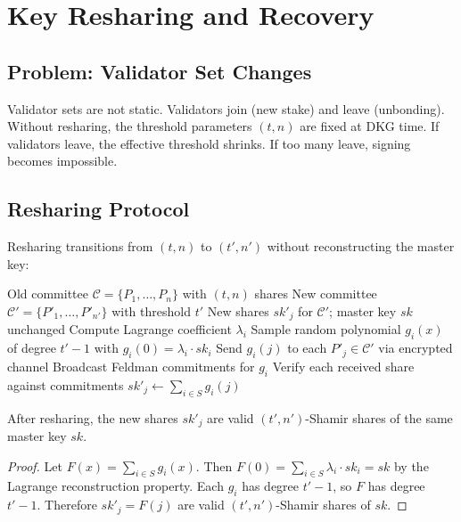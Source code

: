 \section{Key Resharing and Recovery}

\label{sec:resharing}

\subsection{Problem: Validator Set Changes}

Validator sets are not static. Validators join (new stake) and leave (unbonding).
Without resharing, the threshold parameters $(t, n)$ are fixed at DKG time. If
validators leave, the effective threshold shrinks. If too many leave, signing
becomes impossible.

\subsection{Resharing Protocol}

Resharing transitions from $(t, n)$ to $(t', n')$ without reconstructing the
master key:

\begin{algorithm}[ht]
\caption{Proactive Key Resharing.}
\label{alg:resharing}
\begin{algorithmic}[1]
\Require Old committee $\mathcal{C} = \{P_1, \ldots, P_n\}$ with $(t, n)$ shares
\Require New committee $\mathcal{C}' = \{P'_1, \ldots, P'_{n'}\}$ with threshold $t'$
\Ensure New shares $sk'_j$ for $\mathcal{C}'$; master key $sk$ unchanged
  \State Compute Lagrange coefficient $\lambda_i$
  \State Sample random polynomial $g_i(x)$ of degree $t' - 1$ with $g_i(0) = \lambda_i \cdot sk_i$
  \State Send $g_i(j)$ to each $P'_j \in \mathcal{C}'$ via encrypted channel
  \State Broadcast Feldman commitments for $g_i$
\EndFor
{}
  \State Verify each received share against commitments
  \State $sk'_j \leftarrow \sum_{i \in S} g_i(j)$
\EndFor
\end{algorithmic}
\end{algorithm}

\begin{theorem}
After resharing, the new shares $sk'_j$ are valid $(t', n')$-Shamir shares of the
same master key $sk$.
\end{theorem}

\begin{proof}
Let $F(x) = \sum_{i \in S} g_i(x)$. Then $F(0) = \sum_{i \in S} \lambda_i \cdot sk_i = sk$
by the Lagrange reconstruction property. Each $g_i$ has degree $t' - 1$, so $F$ has
degree $t' - 1$. Therefore $sk'_j = F(j)$ are valid $(t', n')$-Shamir shares of $sk$.
\end{proof}

